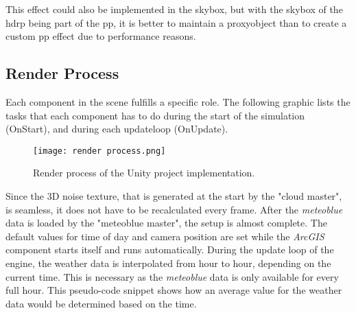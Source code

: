 \begin{figure}[H]
    \centering
    \label{img:techimpl:skyproxy}
\end{figure}

\noindent
This effect could also be implemented in the skybox, but with the skybox of the \gls{hdrp} being part of the \gls{pp}, it is better to maintain a \gls{proxyobject} than to create a custom \gls{pp} effect due to performance reasons.

\clearpage

\subsection{Render Process}
\label{section:techimpl:process}
Each component in the scene fulfills a specific role. The following graphic lists the tasks that each component has to do during the start of the simulation (OnStart), and during each \gls{updateloop} (OnUpdate).

\begin{figure}[H]
    \texttt{[image: render process.png]}
    \caption{Render process of the Unity project implementation.}
\end{figure}

\noindent
Since the 3D \gls{noise} texture, that is generated at the start by the "cloud master", is seamless, it does not have to be recalculated every frame.
After the \emph{meteoblue} data is loaded by the "meteoblue master", the setup is almost complete.
The default values for time of day and camera position are set while the \emph{ArcGIS} component starts itself and runs automatically.
\emptyline
During the update loop of the engine, the weather data is interpolated from hour to hour, depending on the current time.
This is necessary as the \emph{meteoblue} data is only available for every full hour.
This pseudo-code snippet shows how an average value for the weather data would be determined based on the time.


